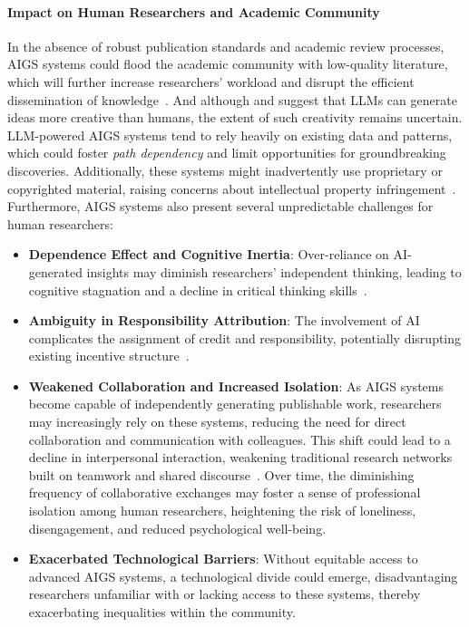 \documentclass{article} %
\newcommand{\AIGS}{AIGS\xspace}
\begin{document}
\paragraph{Impact on Human Researchers and Academic Community}
In the absence of robust publication standards and academic review processes, \AIGS systems could flood the academic community with low-quality literature, which will further increase researchers' workload and disrupt the efficient dissemination of knowledge~\citep{lu2024aiscientist, si2024can, hu2024nova}.
And although \citet{si2024can} and \citet{kumar2024can} suggest that LLMs can generate ideas more creative than humans, the extent of such creativity remains uncertain.
LLM-powered \AIGS systems tend to rely heavily on existing data and patterns, which could foster \textit{path dependency} and limit opportunities for groundbreaking discoveries.
Additionally, these systems might inadvertently use proprietary or copyrighted material, raising concerns about intellectual property infringement~\citep{kumar2024can}.
Furthermore, \AIGS systems also present several unpredictable challenges for human researchers:
\begin{itemize}
    \item \textbf{Dependence Effect and Cognitive Inertia}: Over-reliance on AI-generated insights may diminish researchers’ independent thinking, leading to cognitive stagnation and a decline in critical thinking skills~\citep{si2024can, hu2024nova}.
    \item \textbf{Ambiguity in Responsibility Attribution}: The involvement of AI complicates the assignment of credit and responsibility, potentially disrupting existing incentive structure~\citep{si2024can, hu2024nova}.
    \item \textbf{Weakened Collaboration and Increased Isolation}: As \AIGS systems become capable of independently generating publishable work, researchers may increasingly rely on these systems, reducing the need for direct collaboration and communication with colleagues. This shift could lead to a decline in interpersonal interaction, weakening traditional research networks built on teamwork and shared discourse~\citep{si2024can, hu2024nova}. Over time, the diminishing frequency of collaborative exchanges may foster a sense of professional isolation among human researchers, heightening the risk of loneliness, disengagement, and reduced psychological well-being.
    \item \textbf{Exacerbated Technological Barriers}: Without equitable access to advanced \AIGS systems, a technological divide could emerge, disadvantaging researchers unfamiliar with or lacking access to these systems, thereby exacerbating inequalities within the community.
\end{itemize}
\end{document}
